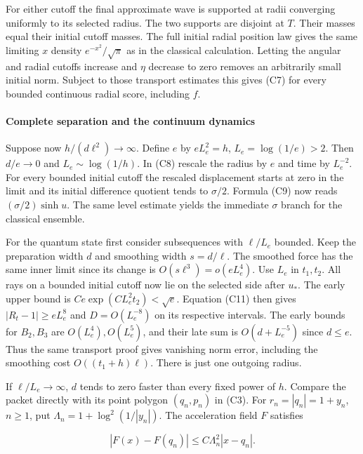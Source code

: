 \documentclass[11pt,a4paper]{article}
\begin{document}
For either cutoff the final approximate wave is supported at radii
converging uniformly to its selected radius. The two supports are
disjoint at \(T\). Their masses equal their initial cutoff masses. The
full initial radial position law gives the same limiting \(x\) density
\(e^{-x^2}/\sqrt\pi\) as in the classical calculation. Letting the
angular and radial cutoffs increase and \(\eta\) decrease to zero
removes an arbitrarily small initial norm. Subject to those transport
estimates this gives (C7) for every bounded continuous radial score,
including \(f\).

\paragraph{Complete separation and the continuum
dynamics}\label{complete-separation-and-the-continuum-dynamics}

Suppose now \(h/(d\ell^2)\to\infty\). Define \(e\) by \(eL_e^2=h\),
\(L_e=\log(1/e)>2\). Then \(d/e\to0\) and \(L_e\sim\log(1/h)\). In (C8)
rescale the radius by \(e\) and time by \(L_e^{-2}\). For every bounded
initial cutoff the rescaled displacement starts at zero in the limit and
its initial difference quotient tends to \(\sigma/2\). Formula (C9) now
reads \((\sigma/2)\sinh u\). The same level estimate yields the
immediate \(\sigma\) branch for the classical ensemble.

For the quantum state first consider subsequences with \(\ell/L_e\)
bounded. Keep the preparation width \(d\) and smoothing width
\(s=d/\ell\). The smoothed force has the same inner limit since its
change is \(O(s\ell^3)=o(e L_e^4)\). Use \(L_e\) in \(t_1,t_2\). All
rays on a bounded initial cutoff now lie on the selected side after
\(u_*\). The early upper bound is \(Ce\exp(C L_e^2 t_2)<\sqrt e\).
Equation (C11) then gives \(|R_t-1|\ge eL_e^8\) and \(D=O(L_e^{-8})\) on
its respective intervals. The early bounds for \(B_2,B_3\) are
\(O(L_e^4),O(L_e^5)\), and their late sum is \(O(d+L_e^{-5})\) since
\(d\le e\). Thus the same transport proof gives vanishing norm error,
including the smoothing cost \(O((t_1+h)\ell)\). There is just one
outgoing radius.

If \(\ell/L_e\to\infty\), \(d\) tends to zero faster than every fixed
power of \(h\). Compare the packet directly with its point polygon
\((q_n,p_n)\) in (C3). For \(r_n=|q_n|=1+y_n\), \(n\ge1\), put
\(\Lambda_n=1+\log^2(1/|y_n|)\). The acceleration field \(F\) satisfies

\[
 |F(x)-F(q_n)|\le C\Lambda_n^2 |x-q_n|.
\]
\end{document}
